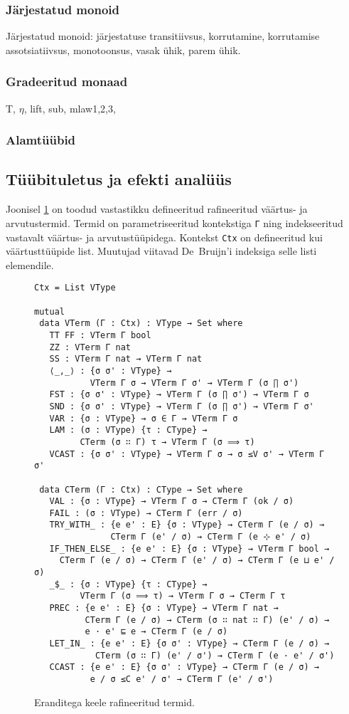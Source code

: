 \documentclass[a4paper,12pt]{article}
\begin{document}
\subsubsection{Järjestatud monoid}
Järjestatud monoid: järjestatuse transitiivsus, korrutamine, korrutamise assotsiatiivsus, monotoonsus, vasak ühik, parem ühik.

\subsubsection{Gradeeritud monaad}
T, $\eta$, lift, sub, mlaw1,2,3, 
\subsubsection{Alamtüübid}

\subsection{Tüübituletus ja efekti analüüs} \label{ssec:exc.inference}

Joonisel \ref{fig:exc.refined} on toodud vastastikku defineeritud rafineeritud väärtus- ja arvutustermid.
Termid on parametriseeritud kontekstiga {\tt Γ} ning indekseeritud vastavalt väärtus- ja arvutustüüpidega.
Kontekst {\tt Ctx} on defineeritud kui väärtusttüüpide list.
Muutujad viitavad De~Bruijn'i indeksiga selle listi elemendile.

\begin{figure}
  \begin{verbatim}
Ctx = List VType

mutual
 data VTerm (Γ : Ctx) : VType → Set where
   TT FF : VTerm Γ bool
   ZZ : VTerm Γ nat
   SS : VTerm Γ nat → VTerm Γ nat
   ⟨_,_⟩ : {σ σ' : VType} →
           VTerm Γ σ → VTerm Γ σ' → VTerm Γ (σ ∏ σ')
   FST : {σ σ' : VType} → VTerm Γ (σ ∏ σ') → VTerm Γ σ
   SND : {σ σ' : VType} → VTerm Γ (σ ∏ σ') → VTerm Γ σ'
   VAR : {σ : VType} → σ ∈ Γ → VTerm Γ σ
   LAM : (σ : VType) {τ : CType} →
         CTerm (σ ∷ Γ) τ → VTerm Γ (σ ⟹ τ)
   VCAST : {σ σ' : VType} → VTerm Γ σ → σ ≤V σ' → VTerm Γ σ'

 data CTerm (Γ : Ctx) : CType → Set where
   VAL : {σ : VType} → VTerm Γ σ → CTerm Γ (ok / σ)
   FAIL : (σ : VType) → CTerm Γ (err / σ)
   TRY_WITH_ : {e e' : E} {σ : VType} → CTerm Γ (e / σ) →
               CTerm Γ (e' / σ) → CTerm Γ (e ⊹ e' / σ)
   IF_THEN_ELSE_ : {e e' : E} {σ : VType} → VTerm Γ bool →
     CTerm Γ (e / σ) → CTerm Γ (e' / σ) → CTerm Γ (e ⊔ e' / σ)
   _$_ : {σ : VType} {τ : CType} →
         VTerm Γ (σ ⟹ τ) → VTerm Γ σ → CTerm Γ τ
   PREC : {e e' : E} {σ : VType} → VTerm Γ nat →
          CTerm Γ (e / σ) → CTerm (σ ∷ nat ∷ Γ) (e' / σ) →
          e · e' ⊑ e → CTerm Γ (e / σ)
   LET_IN_ : {e e' : E} {σ σ' : VType} → CTerm Γ (e / σ) →
            CTerm (σ ∷ Γ) (e' / σ') → CTerm Γ (e · e' / σ')
   CCAST : {e e' : E} {σ σ' : VType} → CTerm Γ (e / σ) →
           e / σ ≤C e' / σ' → CTerm Γ (e' / σ')
  \end{verbatim}
  \caption{Eranditega keele rafineeritud termid.}
  \label{fig:exc.refined}
\end{figure}
\end{document}
